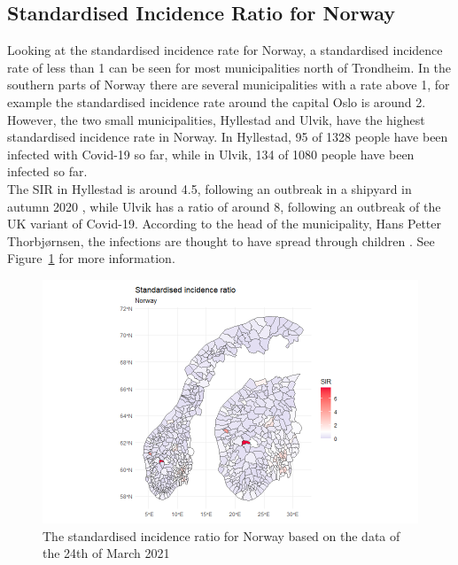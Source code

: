 \subsection{Standardised Incidence Ratio for Norway}
Looking at the standardised incidence rate for Norway, a standardised incidence rate of less than 1 can be seen for most municipalities north of Trondheim. In the southern parts of Norway there are several municipalities with a rate above 1, for example the standardised incidence rate around the capital Oslo is around 2. However, the two small municipalities, Hyllestad and Ulvik, have the highest standardised incidence rate in Norway. In Hyllestad, 95 of 1328 people have been infected with Covid-19 so far, while in Ulvik, 134 of 1080 people have been infected so far. \\
The SIR in Hyllestad is around 4.5, following an outbreak in a shipyard in autumn 2020 \cite{newspaper1}, while Ulvik has a ratio of around 8, following an outbreak of the UK variant of Covid-19. According to the head of the municipality, Hans Petter Thorbjørnsen, the infections are thought to have spread through children \cite{newspaper2}. See Figure~\ref{sirnorway} for more information.
%   
\begin{figure}[H]
  \centering
  \includegraphics[width = 1.2\textwidth]{sir_norway.png}
  \caption{The standardised incidence ratio for Norway based on the data of the 24th of March 2021}
  \label{sirnorway}
\end{figure}
